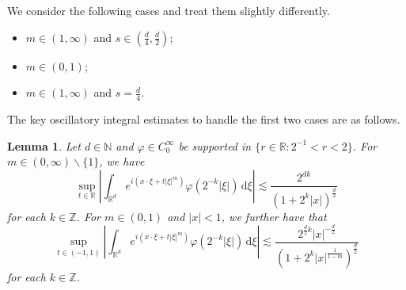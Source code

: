 \documentclass[a4paper]{amsart}
\numberwithin{equation}{section}%
\theoremstyle{plain}%
\newtheorem{lemma}[theorem]{Lemma}
\theoremstyle{definition}
\theoremstyle{remark}%
\def\d{\mathrm{d}}
\begin{document}
We consider the following cases and treat them slightly differently.
\begin{itemize}
\item $m\in(1,\infty)$ and $s\in (\frac d4,\frac d2)$;
\item $m\in (0,1)$;
\item $m\in (1,\infty)$ and $s=\frac d4$.
\end{itemize}
The key oscillatory integral estimates to handle the first two cases are as follows.
\begin{lemma}\label{l:disp space frec loc}
Let $d\in\mathbb{N}$ and $\varphi\in C_0^\infty$ be supported in $\{r \in\mathbb R: 2^{-1} < r < 2\}$. For $m\in(0,\infty)\backslash\{1\}$, we have 
\begin{equation}\label{e:Sjolin}
\sup_{t\in \mathbb R}
\left|
\int_{\mathbb R^d} e^{i(x\cdot \xi+t|\xi|^m)}\varphi(2^{-k}|\xi|)\,\d\xi
\right|
\lesssim
\frac{2^{dk}}{(1+2^k|x|)^{\frac d2}}
\end{equation}
for each $k\in\mathbb Z$. For $m\in(0,1)$ and $|x|<1$, we further have that 
\begin{equation}\label{e:Walther}
\sup_{t\in(-1,1)}
\left|\int_{\mathbb R^d} e^{i(x\cdot\xi+t|\xi|^m)}\varphi(2^{-k}|\xi|)\,\d\xi\right|
\lesssim
\frac{2^{\frac d2 k}|x|^{-\frac d2}}{(1+2^k|x|^{\frac{1}{1-m}})^\frac d2}
\end{equation}
for each $k\in \mathbb Z$.
\end{lemma}
\end{document}
